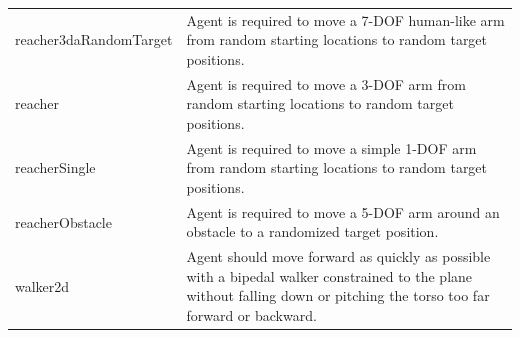 \documentclass{article} %
\begin{document}
\begin{center}
\begin{longtable}{ l | p{10cm} }
reacher3daRandomTarget       & Agent is required to move a 7-DOF human-like arm from random starting locations to random target positions. \\
reacher                      & Agent is required to move a 3-DOF arm from random starting locations to random target positions. \\
reacherSingle                & Agent is required to move a simple 1-DOF arm from random starting locations to random target positions. \\
reacherObstacle              & Agent is required to move a 5-DOF arm around an obstacle to a randomized target position. \\
walker2d                     & Agent should move forward as quickly as possible with a bipedal walker constrained to the plane without falling down or pitching the torso too far forward or backward. \\
\end{longtable}
 \end{center}
\end{document}
